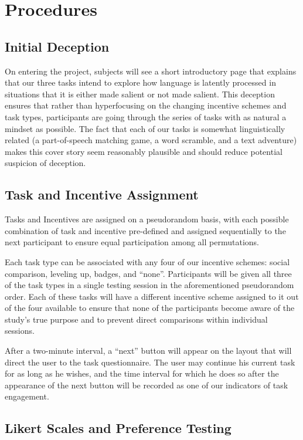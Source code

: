 \section{Procedures}
 \subsection{Initial Deception}
On entering the project, subjects will see a short introductory page that explains that our three tasks intend to explore how language is latently processed in situations that it is either made salient or not made salient. This deception ensures that rather than hyperfocusing on the changing incentive schemes and task types, participants are going through the series of tasks with as natural a mindset as possible. The fact that each of our tasks is somewhat linguistically related (a part-of-speech matching game, a word scramble, and a text adventure) makes this cover story seem reasonably plausible and should reduce potential suspicion of deception.
 
 \subsection{Task and Incentive Assignment}
Tasks and Incentives are assigned on a pseudorandom basis, with each possible combination of task and incentive pre-defined and assigned sequentially to the next participant to ensure equal participation among all permutations.

Each task type can be associated with any four of our incentive schemes: social comparison, leveling up, badges, and “none”. Participants will be given all three of the task types in a single testing session in the aforementioned pseudorandom order. Each of these tasks will have a different incentive scheme assigned to it out of the four available to ensure that none of the participants become aware of the study’s true purpose and to prevent direct comparisons within individual sessions.

After a two-minute interval, a “next” button will appear on the layout that will direct the user to the task questionnaire. The user may continue his current task for as long as he wishes, and the time interval for which he does so after the appearance of the next button will be recorded as one of our indicators of task engagement.  
 \subsection{Likert Scales and Preference Testing}

